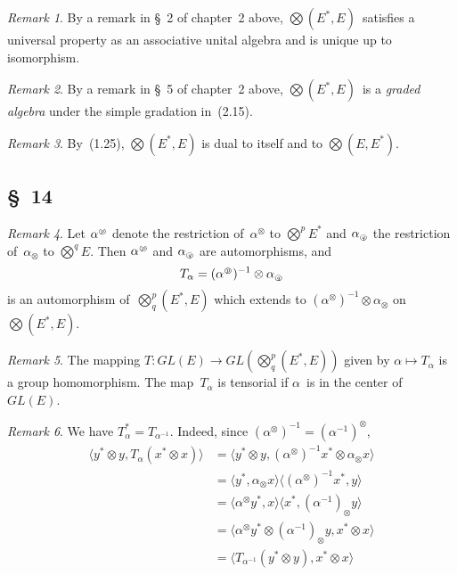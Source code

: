 \documentclass[letterpaper,12pt]{article}
\newcommand{\tprod}{\otimes}
\newcommand{\bigtprod}{\bigotimes}
\newcommand{\medtprod}{{\textstyle\bigtprod}}
\newcommand{\sprod}[2]{\langle#1,#2\rangle}
\newcommand{\circled}[1]{\text{\tiny\textcircled{\textit{#1}}}}
\theoremstyle{definition}
\theoremstyle{remark}
\newtheorem*{rmk}{Remark}
\begin{document}
\begin{rmk}
By a remark in \S~2 of chapter~2 above, \(\medtprod(E^*,E)\)~satisfies a universal property as an associative unital algebra and is unique up to isomorphism.
\end{rmk}

\begin{rmk}
By a remark in \S~5 of chapter~2 above, \(\medtprod(E^*,E)\)~is a \emph{graded algebra} under the simple gradation in~(2.15).
\end{rmk}

\begin{rmk}
By~(1.25), \(\medtprod(E^*,E)\) is dual to itself and to \(\medtprod(E,E^*)\).
\end{rmk}

\subsection*{\S~14}
\begin{rmk}
Let \(\alpha^{\circled{p}}\) denote the restriction of~\(\alpha^{\tprod}\) to \(\medtprod^p E^*\) and \(\alpha_{\circled{q}}\) the restriction of~\(\alpha_{\tprod}\) to \(\medtprod^q E\). Then \(\alpha^{\circled{p}}\) and \(\alpha_{\circled{q}}\) are automorphisms, and
\[T_{\alpha}=(\alpha^{\circled{p}})^{-1}\tprod\alpha_{\circled{q}}\]
is an automorphism of~\(\medtprod^p_q(E^*,E)\) which extends to \((\alpha^{\tprod})^{-1}\tprod\alpha_{\tprod}\) on~\(\medtprod(E^*,E)\).
\end{rmk}

\begin{rmk}
The mapping \(T:GL(E)\to GL(\medtprod^p_q(E^*,E))\) given by \(\alpha\mapsto T_{\alpha}\) is a group homomorphism. The map~\(T_{\alpha}\) is tensorial if \(\alpha\)~is in the center of~\(GL(E)\).
\end{rmk}

\begin{rmk}
We have \(T_{\alpha}^*=T_{\alpha^{-1}}\). Indeed, since \((\alpha^{\tprod})^{-1}=(\alpha^{-1})^{\tprod}\),
\begin{align*}
\sprod{y^*\tprod y}{T_{\alpha}(x^*\tprod x)}&=\sprod{y^*\tprod y}{(\alpha^{\tprod})^{-1}x^*\tprod\alpha_{\tprod}x}\\
	&=\sprod{y^*}{\alpha_{\tprod}x}\sprod{(\alpha^{\tprod})^{-1}x^*}{y}\\
	&=\sprod{\alpha^{\tprod}y^*}{x}\sprod{x^*}{(\alpha^{-1})_{\tprod}y}\\
	&=\sprod{\alpha^{\tprod}y^*\tprod(\alpha^{-1})_{\tprod}y}{x^*\tprod x}\\
	&=\sprod{T_{\alpha^{-1}}(y^*\tprod y)}{x^*\tprod x}
\end{align*}
\end{rmk}
\end{document}
